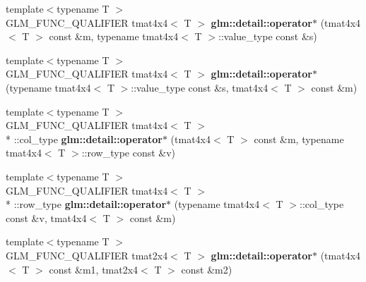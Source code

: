 \begin{DoxyCompactItemize}
\item 
\hypertarget{namespaceglm_1_1detail_ace2530d9d1d3fc7ac4e2a76d65467fed}{{\footnotesize template$<$typename T $>$ }\\G\-L\-M\-\_\-\-F\-U\-N\-C\-\_\-\-Q\-U\-A\-L\-I\-F\-I\-E\-R tmat4x4$<$ T $>$ {\bfseries glm\-::detail\-::operator$\ast$} (tmat4x4$<$ T $>$ const \&m, typename tmat4x4$<$ T $>$\-::value\-\_\-type const \&s)}\label{namespaceglm_1_1detail_ace2530d9d1d3fc7ac4e2a76d65467fed}

\item 
\hypertarget{namespaceglm_1_1detail_ab15a8b6c9206f93b74611f82cc77a95a}{{\footnotesize template$<$typename T $>$ }\\G\-L\-M\-\_\-\-F\-U\-N\-C\-\_\-\-Q\-U\-A\-L\-I\-F\-I\-E\-R tmat4x4$<$ T $>$ {\bfseries glm\-::detail\-::operator$\ast$} (typename tmat4x4$<$ T $>$\-::value\-\_\-type const \&s, tmat4x4$<$ T $>$ const \&m)}\label{namespaceglm_1_1detail_ab15a8b6c9206f93b74611f82cc77a95a}

\item 
\hypertarget{namespaceglm_1_1detail_af97a2dc9dc200c8b81fec29178dbcfbc}{{\footnotesize template$<$typename T $>$ }\\G\-L\-M\-\_\-\-F\-U\-N\-C\-\_\-\-Q\-U\-A\-L\-I\-F\-I\-E\-R tmat4x4$<$ T $>$\\*
\-::col\-\_\-type {\bfseries glm\-::detail\-::operator$\ast$} (tmat4x4$<$ T $>$ const \&m, typename tmat4x4$<$ T $>$\-::row\-\_\-type const \&v)}\label{namespaceglm_1_1detail_af97a2dc9dc200c8b81fec29178dbcfbc}

\item 
\hypertarget{namespaceglm_1_1detail_a4efac78463573bd8560b6a1d939c5664}{{\footnotesize template$<$typename T $>$ }\\G\-L\-M\-\_\-\-F\-U\-N\-C\-\_\-\-Q\-U\-A\-L\-I\-F\-I\-E\-R tmat4x4$<$ T $>$\\*
\-::row\-\_\-type {\bfseries glm\-::detail\-::operator$\ast$} (typename tmat4x4$<$ T $>$\-::col\-\_\-type const \&v, tmat4x4$<$ T $>$ const \&m)}\label{namespaceglm_1_1detail_a4efac78463573bd8560b6a1d939c5664}

\item 
\hypertarget{namespaceglm_1_1detail_a9ffe734881cad285ce8be6f50b225dd6}{{\footnotesize template$<$typename T $>$ }\\G\-L\-M\-\_\-\-F\-U\-N\-C\-\_\-\-Q\-U\-A\-L\-I\-F\-I\-E\-R tmat2x4$<$ T $>$ {\bfseries glm\-::detail\-::operator$\ast$} (tmat4x4$<$ T $>$ const \&m1, tmat2x4$<$ T $>$ const \&m2)}\label{namespaceglm_1_1detail_a9ffe734881cad285ce8be6f50b225dd6}


\end{DoxyCompactItemize}

